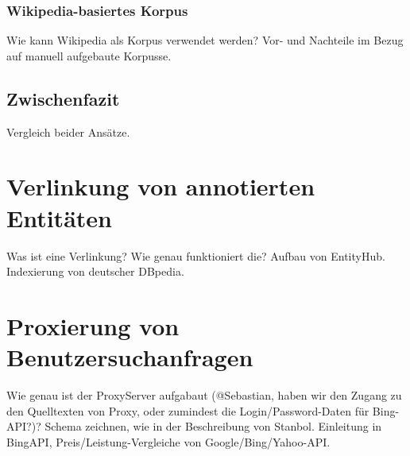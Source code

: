\paragraph{}


\subsubsection{Wikipedia-basiertes Korpus}
Wie kann Wikipedia als Korpus verwendet werden? Vor- und Nachteile im Bezug auf manuell aufgebaute Korpusse.

\subsection{Zwischenfazit}
Vergleich beider Ansätze.

\section{Verlinkung von annotierten Entitäten}
Was ist eine Verlinkung? Wie genau funktioniert die? Aufbau von EntityHub. Indexierung von deutscher DBpedia.

\section{Proxierung von Benutzersuchanfragen}
Wie genau ist der ProxyServer aufgabaut (@Sebastian, haben wir den Zugang zu den Quelltexten von Proxy, oder zumindest die Login/Password-Daten für Bing-API?)? Schema zeichnen, wie in der Beschreibung von Stanbol. Einleitung in BingAPI, Preis/Leistung-Vergleiche von Google/Bing/Yahoo-API.